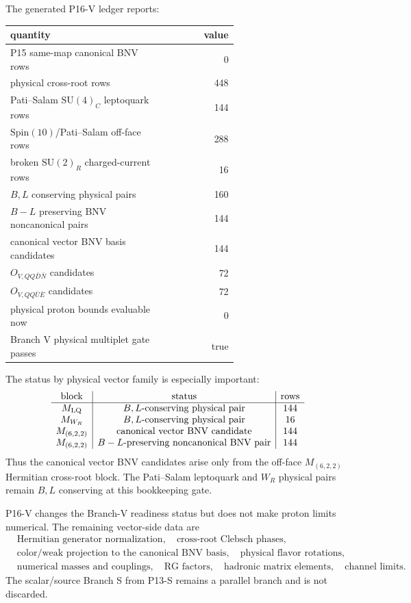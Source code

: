 \documentclass[11pt]{article}
\newcommand{\SU}{\mathrm{SU}}
\newcommand{\Spin}{\mathrm{Spin}}
\begin{document}
The generated P16-V ledger reports:
\begin{center}
\small
\begin{tabular}{p{0.66\linewidth}r}
\toprule
quantity & value\\
\midrule
P15 same-map canonical BNV rows & 0\\
physical cross-root rows & 448\\
Pati--Salam $\SU(4)_C$ leptoquark rows & 144\\
$\Spin(10)$/Pati--Salam off-face rows & 288\\
broken $\SU(2)_R$ charged-current rows & 16\\
$B,L$ conserving physical pairs & 160\\
$B-L$ preserving BNV noncanonical pairs & 144\\
canonical vector BNV basis candidates & 144\\
$O_{V,QQ\bar D\bar N}$ candidates & 72\\
$O_{V,QQ\bar U\bar E}$ candidates & 72\\
physical proton bounds evaluable now & 0\\
Branch V physical multiplet gate passes & true\\
\bottomrule
\end{tabular}
\end{center}
The status by physical vector family is especially important:
\begin{equation}
\begin{array}{c|c|c}
\text{block} & \text{status} & \text{rows}\\
\hline
M_{\rm LQ} & B,L\text{-conserving physical pair} & 144\\
M_{W_R} & B,L\text{-conserving physical pair} & 16\\
M_{(6,2,2)} & \text{canonical vector BNV candidate} & 144\\
M_{(6,2,2)} & B-L\text{-preserving noncanonical BNV pair} & 144
\end{array}
\end{equation}
Thus the canonical vector BNV candidates arise only from the off-face
$M_{(6,2,2)}$ Hermitian cross-root block.  The Pati--Salam leptoquark and
$W_R$ physical pairs remain $B,L$ conserving at this bookkeeping gate.

P16-V changes the Branch-V readiness status but does not make proton limits
numerical.  The remaining vector-side data are
\begin{equation}
\begin{split}
  &\text{Hermitian generator normalization},\quad
  \text{cross-root Clebsch phases},\\
  &\text{color/weak projection to the canonical BNV basis},\quad
  \text{physical flavor rotations},\\
  &\text{numerical masses and couplings},\quad
  \text{RG factors},\quad
  \text{hadronic matrix elements},\quad
  \text{channel limits}.
\end{split}
\end{equation}
The scalar/source Branch S from P13-S remains a parallel branch and is not
discarded.
\end{document}
